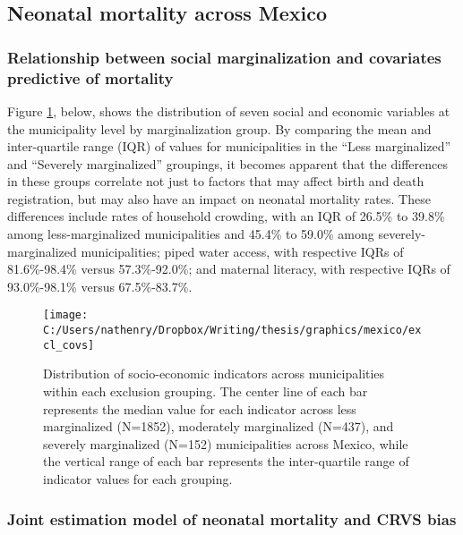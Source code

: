 \documentclass[
]{article}
\begin{document}
\hypertarget{neonatal-mortality-across-mexico}{%
\subsection{Neonatal mortality across Mexico}\label{neonatal-mortality-across-mexico}}

\hypertarget{relationship-between-social-marginalization-and-covariates-predictive-of-mortality}{%
\subsubsection{Relationship between social marginalization and covariates predictive of mortality}\label{relationship-between-social-marginalization-and-covariates-predictive-of-mortality}}

Figure \ref{fig:excl-covs}, below, shows the distribution of seven social and economic variables at the municipality level by marginalization group. By comparing the mean and inter-quartile range (IQR) of values for municipalities in the ``Less marginalized'' and ``Severely marginalized'' groupings, it becomes apparent that the differences in these groups correlate not just to factors that may affect birth and death registration, but may also have an impact on neonatal mortality rates. These differences include rates of household crowding, with an IQR of 26.5\% to 39.8\% among less-marginalized municipalities and 45.4\% to 59.0\% among severely-marginalized municipalities; piped water access, with respective IQRs of 81.6\%-98.4\% versus 57.3\%-92.0\%; and maternal literacy, with respective IQRs of 93.0\%-98.1\% versus 67.5\%-83.7\%.

\begin{figure}[!ht]

{\centering \texttt{[image: C:/Users/nathenry/Dropbox/Writing/thesis/graphics/mexico/excl\_covs]} 

}

\caption{Distribution of socio-economic indicators across municipalities within each exclusion grouping. The center line of each bar represents the median value for each indicator across less marginalized (N=1852), moderately marginalized (N=437), and severely marginalized (N=152) municipalities across Mexico, while the vertical range of each bar represents the inter-quartile range of indicator values for each grouping.}\label{fig:excl-covs}
\end{figure}

\hypertarget{joint-estimation-model-of-neonatal-mortality-and-crvs-bias}{%
\subsubsection{Joint estimation model of neonatal mortality and CRVS bias}\label{joint-estimation-model-of-neonatal-mortality-and-crvs-bias}}
\end{document}
